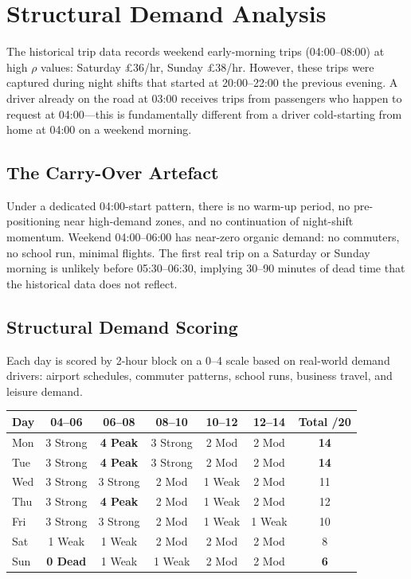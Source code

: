 \documentclass[a4paper,11pt]{article}
\begin{document}
\section{Structural Demand Analysis}

The historical trip data records weekend early-morning trips (04:00--08:00) at high $\rho$ values: Saturday \pounds36/hr, Sunday \pounds38/hr. However, these trips were captured during night shifts that started at 20:00--22:00 the previous evening. A driver already on the road at 03:00 receives trips from passengers who happen to request at 04:00---this is fundamentally different from a driver cold-starting from home at 04:00 on a weekend morning.

\subsection{The Carry-Over Artefact}

Under a dedicated 04:00-start pattern, there is no warm-up period, no pre-positioning near high-demand zones, and no continuation of night-shift momentum. Weekend 04:00--06:00 has near-zero organic demand: no commuters, no school run, minimal flights. The first real trip on a Saturday or Sunday morning is unlikely before 05:30--06:30, implying 30--90 minutes of dead time that the historical data does not reflect.

\subsection{Structural Demand Scoring}

Each day is scored by 2-hour block on a 0--4 scale based on real-world demand drivers: airport schedules, commuter patterns, school runs, business travel, and leisure demand.

\begin{tabularx}{\textwidth}{l C C C C C C}
\toprule
\textbf{Day} & \textbf{04--06} & \textbf{06--08} & \textbf{08--10} & \textbf{10--12} & \textbf{12--14} & \textbf{Total /20} \\
\midrule
Mon & 3 Strong & \textbf{4 Peak} & 3 Strong & 2 Mod & 2 Mod & \textbf{14} \\
Tue & 3 Strong & \textbf{4 Peak} & 3 Strong & 2 Mod & 2 Mod & \textbf{14} \\
Wed & 3 Strong & 3 Strong & 2 Mod & 1 Weak & 2 Mod & 11 \\
Thu & 3 Strong & \textbf{4 Peak} & 2 Mod & 1 Weak & 2 Mod & 12 \\
Fri & 3 Strong & 3 Strong & 2 Mod & 1 Weak & 1 Weak & 10 \\
Sat & 1 Weak & 1 Weak & 2 Mod & 2 Mod & 2 Mod & 8 \\
Sun & \textbf{0 Dead} & 1 Weak & 1 Weak & 2 Mod & 2 Mod & \textbf{6} \\
\bottomrule
\end{tabularx}
\end{document}
